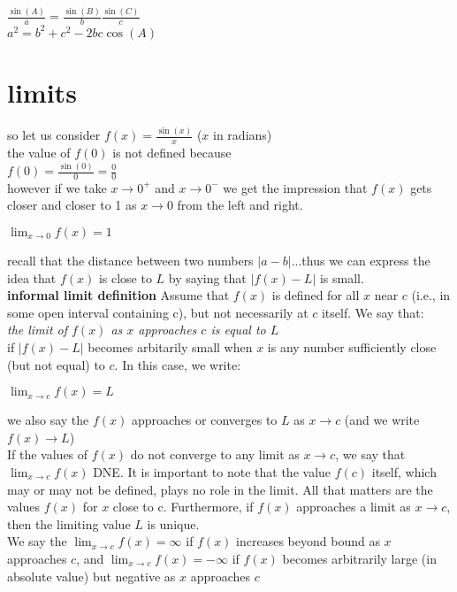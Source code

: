 \documentclass{article}
\begin{document}
	$\frac{\sin(A)}{a} = \frac{\sin(B)}{b} \frac{\sin(C)}{c}$\\
	$a^2 = b^2 + c^2 - 2bc\cos(A)$\\

\newpage
\section*{limits}
	so let us consider $f(x) = \frac{\sin(x)}{x}$ ($x$ in radians)\\
	the value of $f(0)$ is not defined because\\
	$f(0) = \frac{\sin(0)}{0} = \frac{0}{0}$\\
	however if we take $x \to 0^{+}$ and $x \to 0^{-}$ we get the impression that $f(x)$ gets closer and closer to 1 as $x \to 0$ from the left and right.
	\begin{center}
		$\lim_{x \to 0}f(x) = 1$
	\end{center}
	recall that the distance between two numbers $\lvert a - b\rvert$...thus we can express the idea that $f(x)$ is close to $L$ by saying that $\lvert f(x) - L\rvert$ is small.\\

	\textbf{informal limit definition} Assume that $f(x)$ is defined for all $x$ near $c$ (i.e., in some open interval containing c), but not necessarily at $c$ itself. We say that:\\
	\textit{the limit of $f(x)$ as $x$ approaches $c$ is equal to $L$}\\
	if $\lvert f(x) - L\rvert$ becomes arbitarily small when $x$ is any number sufficiently close (but not equal) to $c$. In this case, we write:
	\begin{center}
		$\lim_{x \to c}f(x) = L$
	\end{center}
	we also say the $f(x)$ approaches or converges to $L$ as $x \to c$ (and we write $f(x) \to L$)\\

	If the values of $f(x)$ do not converge to any limit as $x \to c$, we say that $\lim_{x \to c}f(x)$ DNE. It is important to note that the value $f(c)$ itself, which may or may not be defined, plays no role in the limit. All that matters are the values $f(x)$ for $x$ close to c. Furthermore, if $f(x)$ approaches a limit as $x \to c$, then the limiting value $L$ is unique.\\

	We say the $\lim_{x \to c}f(x) = \infty$ if $f(x)$ increases beyond bound as $x$ approaches $c$, and $\lim_{x \to c}f(x) = -\infty$ if $f(x)$ becomes arbitrarily large (in absolute value) but negative as $x$ approaches $c$\\
\end{document}
